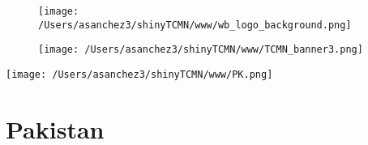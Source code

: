 \documentclass{article}\usepackage[]{graphicx}\usepackage[]{color}
\begin{document}
%

\begin{figure}
  \vspace{-3ex} %
  \hspace{-7ex} %
  \texttt{[image: /Users/asanchez3/shinyTCMN/www/wb\_logo\_background.png]}
\end{figure}
\begin{figure}
  \begin{minipage}[t]{0.99\textwidth} %
      \vspace{-30ex}
      \hspace{-2ex}
      \raggedright{\texttt{[image: /Users/asanchez3/shinyTCMN/www/TCMN\_banner3.png]}}
  \end{minipage}
\end{figure}
%
\begin{minipage}[t]{0.99\textwidth} %
  \vspace{-1.5cm}
  \begin{minipage}[c]{0.36\textwidth} 
    \begin{minipage}[c]{0.28\textwidth} %
      \texttt{[image: /Users/asanchez3/shinyTCMN/www/PK.png]}
    \end{minipage}
    \begin{minipage}[c]{0.70\textwidth} %
      \section*{\color{blue!40!black}Pakistan}
    \end{minipage}
  \end{minipage}
  \begin{minipage}[c]{0.63\textwidth}
    \begin{flushleft}  
    \end{flushleft} 
  \end{minipage}  
\end{minipage} %
\end{document}
